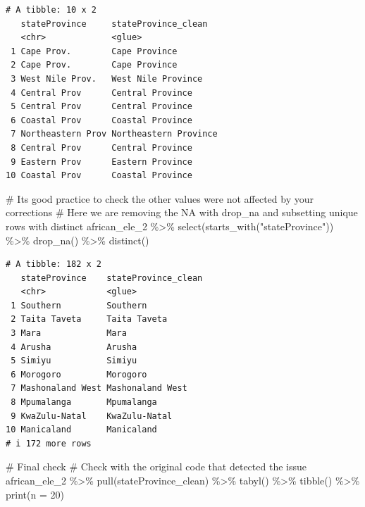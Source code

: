 \documentclass[
  letterpaper,
  DIV=11,
  numbers=noendperiod,
  oneside]{scrreprt}
\newenvironment{Shaded}{\begin{snugshade}}{\end{snugshade}}
\newcommand{\AttributeTok}[1]{\textcolor[rgb]{0.40,0.45,0.13}{#1}}
\newcommand{\CommentTok}[1]{\textcolor[rgb]{0.37,0.37,0.37}{#1}}
\newcommand{\DecValTok}[1]{\textcolor[rgb]{0.68,0.00,0.00}{#1}}
\newcommand{\FunctionTok}[1]{\textcolor[rgb]{0.28,0.35,0.67}{#1}}
\newcommand{\NormalTok}[1]{\textcolor[rgb]{0.00,0.23,0.31}{#1}}
\newcommand{\SpecialCharTok}[1]{\textcolor[rgb]{0.37,0.37,0.37}{#1}}
\newcommand{\StringTok}[1]{\textcolor[rgb]{0.13,0.47,0.30}{#1}}
\begin{document}
\begin{verbatim}
# A tibble: 10 x 2
   stateProvince     stateProvince_clean  
   <chr>             <glue>               
 1 Cape Prov.        Cape Province        
 2 Cape Prov.        Cape Province        
 3 West Nile Prov.   West Nile Province   
 4 Central Prov      Central Province     
 5 Central Prov      Central Province     
 6 Coastal Prov      Coastal Province     
 7 Northeastern Prov Northeastern Province
 8 Central Prov      Central Province     
 9 Eastern Prov      Eastern Province     
10 Coastal Prov      Coastal Province     
\end{verbatim}

\begin{Shaded}
\begin{Highlighting}[]
\CommentTok{\# Its good practice to check the other values were not affected by your corrections}
\CommentTok{\# Here we are removing the NA with \textasciigrave{}drop\_na\textasciigrave{} and subsetting unique rows with \textasciigrave{}distinct\textasciigrave{}}
\NormalTok{african\_ele\_2 }\SpecialCharTok{\%\textgreater{}\%} 
  \FunctionTok{select}\NormalTok{(}\FunctionTok{starts\_with}\NormalTok{(}\StringTok{"stateProvince"}\NormalTok{)) }\SpecialCharTok{\%\textgreater{}\%} 
  \FunctionTok{drop\_na}\NormalTok{() }\SpecialCharTok{\%\textgreater{}\%} 
  \FunctionTok{distinct}\NormalTok{() }
\end{Highlighting}
\end{Shaded}

\begin{verbatim}
# A tibble: 182 x 2
   stateProvince    stateProvince_clean
   <chr>            <glue>             
 1 Southern         Southern           
 2 Taita Taveta     Taita Taveta       
 3 Mara             Mara               
 4 Arusha           Arusha             
 5 Simiyu           Simiyu             
 6 Morogoro         Morogoro           
 7 Mashonaland West Mashonaland West   
 8 Mpumalanga       Mpumalanga         
 9 KwaZulu-Natal    KwaZulu-Natal      
10 Manicaland       Manicaland         
# i 172 more rows
\end{verbatim}

\begin{Shaded}
\begin{Highlighting}[]
\CommentTok{\# Final check}
\CommentTok{\# Check with the original code that detected the issue}
\NormalTok{african\_ele\_2 }\SpecialCharTok{\%\textgreater{}\%}
  \FunctionTok{pull}\NormalTok{(stateProvince\_clean) }\SpecialCharTok{\%\textgreater{}\%} 
  \FunctionTok{tabyl}\NormalTok{() }\SpecialCharTok{\%\textgreater{}\%} 
  \FunctionTok{tibble}\NormalTok{() }\SpecialCharTok{\%\textgreater{}\%} 
  \FunctionTok{print}\NormalTok{(}\AttributeTok{n =} \DecValTok{20}\NormalTok{)}
\end{Highlighting}
\end{Shaded}
\end{document}
